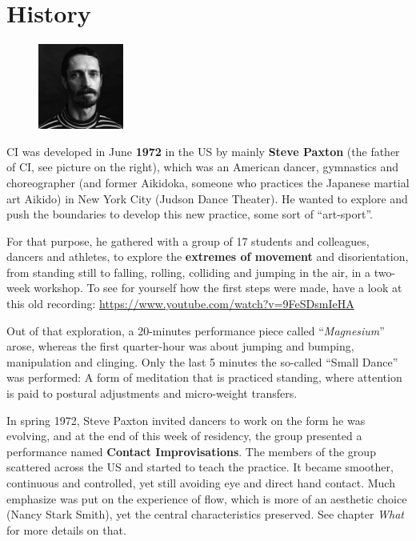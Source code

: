 \section{History}\label{sec:history}

\begin{figure}
\centering
\includegraphics[width=0.25\textwidth]{images/history}
\end{figure}

CI was developed in June \textbf{1972} in the US by mainly \textbf{Steve Paxton} (the father of CI, see picture on the right), which was an American dancer, gymnastics and choreographer (and former Aikidoka, someone who practices the Japanese martial art Aikido) in New York City (Judson Dance Theater).
He wanted to explore and push the boundaries to develop this new practice, some sort of ``art-sport''.

For that purpose, he gathered with a group of 17 students and colleagues, dancers and athletes, to explore the \textbf{extremes of movement} and disorientation, from standing still to falling, rolling, colliding and jumping in the air, in a two-week workshop.
To see for yourself how the first steps were made, have a look at this old recording: \url{https://www.youtube.com/watch?v=9FeSDsmIeHA}

Out of that exploration, a 20-minutes performance piece called ``\textit{Magnesium}'' arose, whereas the first quarter-hour was about jumping and bumping, manipulation and clinging.
Only the last 5 minutes the so-called ``Small Dance'' was performed: A form of meditation that is practiced standing, where attention is paid to postural adjustments and micro-weight transfers.

In spring 1972, Steve Paxton invited dancers to work on the form he was evolving, and at the end of this week of residency, the group presented a performance named \textbf{Contact Improvisations}.
The members of the group scattered across the US and started to teach the practice.
It became smoother, continuous and controlled, yet still avoiding eye and direct hand contact.
Much emphasize was put on the experience of flow, which is more of an aesthetic choice (Nancy Stark Smith), yet the central characteristics preserved.
See chapter \textit{What} for more details on that.

